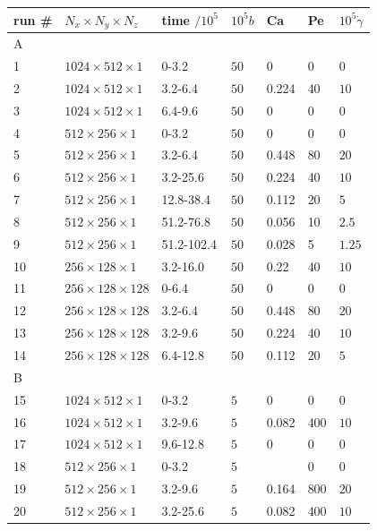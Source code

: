 \documentclass[8.5pt,twoside,twocolumn]{article}
\begin{document}
\begin{table}[htp]
\small
\begin{tabular*}{0.52\textwidth}{l|l|l|l|l|l|l}
\hline
run \# & $N_x\times N_y\times N_z$ & time $/10^5$ & $10^5b$ & Ca & Pe & $10^5\dot\gamma$\\
\hline
A & & & & & &\\
\hline 
1 & $1024\times512\times1$ & 0-3.2 & $50$ &0 &0 & 0 \\
2 & $1024\times512\times1$ & 3.2-6.4& $50$ & 0.224 & 40 &  $10$\\
3 & $1024\times512\times1$ & 6.4-9.6& $50$ &0 & 0 &  0 \\
\hline
4 & $512\times256\times1$ & 0-3.2 & $50$ &0 & 0 &  0\\
5 & $512\times256\times1$ & 3.2-6.4& $50$ &0.448 & 80 &  $20$ \\
6 & $512\times256\times1$ & 3.2-25.6& $50$ &0.224 & 40 &  $10$ \\
7 & $512\times256\times1$ & 12.8-38.4& $50$ &0.112 & 20 &  $ 5$ \\
8 & $512\times256\times1$ & 51.2-76.8& $50$ &0.056 & 10 &  $ 2.5$ \\
9 & $512\times256\times1$ & 51.2-102.4& $50$ &0.028 & 5 &  $1.25$ \\
\hline
10 & $256\times128\times1$ & 3.2-16.0& $50$ &0.22 & 40 &  $10$ \\
\hline
11 & $256\times128\times128$ & 0-6.4 & $50$ &0 & 0 &  0\\
12 & $256\times128\times128$ & 3.2-6.4 & $50$ &0.448 & 80 &  $20$\\
13 & $256\times128\times128$ & 3.2-9.6 & $50$ &0.224 & 40 &  $10$\\
14 & $256\times128\times128$ & 6.4-12.8 & $50$ &0.112 & 20 &  $5$\\
\hline
B & & & & & &\\
\hline
15 & $1024\times512\times1$ & 0-3.2 & $5$ &0 & 0 &  0 \\
16 & $1024\times512\times1$ & 3.2-9.6& $5$ &0.082 & 400 &  $10$ \\
17 & $1024\times512\times1$ & 9.6-12.8& $5$ &0 & 0 &  0 \\
\hline
18 & $512\times256\times1$ & 0-3.2 & $5$ & & 0 &  0 \\
19 & $512\times256\times1$ & 3.2-9.6& $5$ &0.164 & 800 &  $20$ \\
20 & $512\times256\times1$ & 3.2-25.6& $5$ &0.082 & 400 &  $10$ \\

\end{tabular*}
\end{table}
\end{document}
